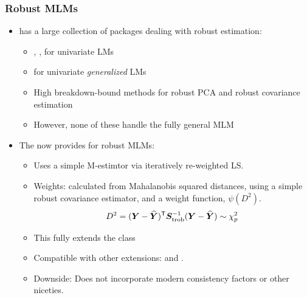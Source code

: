\begin{frame}
  \frametitle{Robust MLMs}

  \begin{itemize}
  \item {} has a large collection of packages dealing with robust estimation:
    \begin{itemize}
    \item {}, , for univariate LMs
    \item {} for univariate \emph{generalized} LMs
    \item \alert{High breakdown-bound} methods for robust PCA and robust covariance estimation
    \item However, none of these handle the \alert{fully general MLM}  
    \end{itemize}
  \item
    The  now provides  for robust MLMs:
    \begin{itemize}
    \item Uses a simple M-estimtor via iteratively re-weighted LS.
    \item Weights: calculated from Mahalanobis squared distances, using
    a simple robust covariance estimator, 
    and a weight function, $\psi (D^2)$.
    \begin{equation}
    D^2 = (\bm{Y} - \widehat{\bm{Y}})^\mathsf{T} \bm{S}_{\mathrm{trob}}^{-1} (\bm{Y} - \widehat{\bm{Y}})
       \sim \chi^2_p
    \end{equation}
    \item This fully extends the  class
    \item Compatible with other   extensions:  and
			.
		\item Downside: Does not incorporate modern consistency factors or other
		niceties.
    \end{itemize}
  \end{itemize}
\end{frame}

